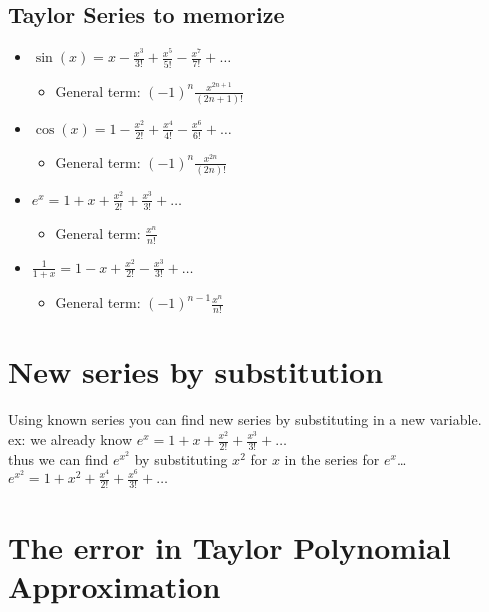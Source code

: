 \documentclass{report}
\begin{document}
\subsection{Taylor Series to memorize}
\begin{itemize}
  \item $ \sin(x) = x - \frac{x^3}{3!} + \frac{x^5}{5!} - \frac{x^7}{7!} + \dots $
  \begin{itemize}
    \item General term: $ (-1)^{n}\frac{x^{2n+1}}{(2n+1)!} $
  \end{itemize}
  \item $ \cos(x) = 1 - \frac{x^2}{2!} + \frac{x^4}{4!} - \frac{x^6}{6!} + \dots $
  \begin{itemize}
    \item General term: $ (-1)^{n}\frac{x^{2n}}{(2n)!} $
  \end{itemize}
  \item $ e^x = 1 + x + \frac{x^2}{2!} + \frac{x^3}{3!} + \dots $ 
  \begin{itemize}
    \item General term: $ \frac{x^n}{n!} $
  \end{itemize}
\item $ \frac{1}{1+x} = 1 - x + \frac{x^2}{2!} - \frac{x^3}{3!} + \dots $
  \begin{itemize}
    \item General term: $ (-1)^{n-1}\frac{x^n}{n!} $
  \end{itemize}
\end{itemize}

\section{New series by substitution}
Using known series you can find new series by substituting in a new variable.
\\
ex: we already know $ e^x = 1 + x + \frac{x^2}{2!} + \frac{x^3}{3!} + \dots $
\\
thus we can find $ e^{x^2} $ by substituting $ x^2 $ for $ x $ in the series for $ e^x $\dots
\\
$ e^{x^2} = 1 + x^2 + \frac{x^4}{2!} + \frac{x^6}{3!} + \dots $

\section{The error in Taylor Polynomial Approximation}
\end{document}
